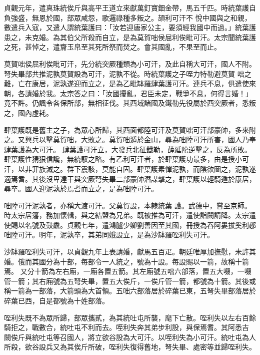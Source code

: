 \begin{pinyinscope}
 貞觀元年，遣真珠統俟斤與高平王道立來獻萬釘寶鈿金帶，馬五千匹。時統葉護自負強盛，無恩於國，部眾咸怨，歌邏祿種多叛之。頡利可汗不
 悅中國與之和親，數遣兵入寇，又遣人謂統葉護曰：「汝若迎唐家公主，要須經我國中而過。」統葉護患之，未克婚。為其伯父所殺而自立，是為莫賀咄侯屈利俟毗可汗。太宗聞統葉護之死，甚悼之，遣齎玉帛至其死所祭而焚之。會其國亂，不果至而止。



 莫賀咄侯屈利俟毗可汗，先分統突厥種類為小可汗，及此自稱大可汗，國人不附。弩失畢部共推泥孰莫賀設為可汗，泥孰不從。時統葉護之子咥力特勒避莫賀
 咄之難，亡在康居，泥孰遂迎而立之，是為乙毗缽羅肆葉護可汗。連兵不息，俱遣使來朝，各請婚於我。太宗答之曰：「汝國擾亂，君臣未定，戰爭不息，何得言婚！」竟不許。仍諷令各保所部，無相征伐。其西域諸國及鐵勒先役屬於西突厥者，悉叛之，國內虛耗。



 肆葉護既是舊主之子，為眾心所歸，其西面都陸可汗及莫賀咄可汗部豪帥，多來附之。又興兵以擊莫賀咄，大敗之。莫賀咄遁於金山，尋為咄陸可汗所害，國人乃奉肆葉護為大可汗。
 肆葉護可汗立，大發兵北征鐵勒，薛延陀逆擊之，反為所敗。肆葉護性猜狠信讒，無統馭之略。有乙利可汗者，於肆葉護功最多，由是授小可汗，以非罪族滅之。群下震駭，莫能自固。肆葉護素憚泥孰，而陰欲圖之，泥孰遂適焉耆。其後沒卑達干與突厥弩失畢二部豪帥潛謀擊之，肆葉護以輕騎遁於康居，尋卒。國人迎泥孰於焉耆而立之，是為咄陸可汗。



 咄陸可汗泥孰者，亦稱大渡可汗。父莫賀設，本隸統葉
 護。武德中，嘗至京師。時太宗居籓，務加懷輯，與之結盟為兄弟。既被推為可汗，遣使詣闕請降。太宗遣使賜以名號及鼓纛。貞觀七年，遣鴻臚少卿劉善因至其國，冊授為吞阿婁拔奚利邲咄陸可汗。明年，泥孰卒，其弟同娥設立，是為沙缽羅咥利失可汗。



 沙缽羅咥利失可汗，以貞觀九年上表請婚，獻馬五百疋。朝廷唯厚加撫慰，未許其婚。俄而其國分為十部，每部令一人統之，號為十設。每設賜以一箭，故稱十箭焉。
 又分十箭為左右廂，一廂各置五箭。其左廂號五咄六部落，置五大啜，一啜管一箭；其右廂號為五弩失畢，置五大俟斤，一俟斤管一箭，都號為十箭。其後或稱一箭為一部落，大箭頭為大首領。五咄六部落居於碎葉已東，五弩失畢部落居於碎葉已西，自是都號為十姓部落。



 咥利失既不為眾所歸，部眾攜貳，為其統吐屯所襲，麾下亡散。咥利失以左右百餘騎拒之，戰數合，統吐屯不利而去。咥利失奔其弟步利設，與保焉耆。其阿悉吉
 闕俟斤與統吐屯等召國人，將立欲谷設為大可汗。以咥利失為小可汗。統吐屯為人所殺，欲谷設兵又為其俟斤所破，咥利失復得舊地，弩失畢、處密等並歸咥利失。




\end{pinyinscope}
